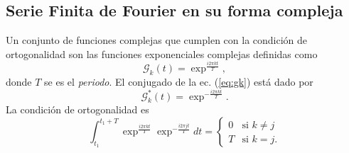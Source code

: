 \documentclass{article}
\begin{document}
\subsection*{Serie Finita de Fourier en su forma compleja}
Un conjunto de funciones complejas que cumplen con la condici\'on de ortogonalidad son las funciones exponenciales complejas definidas como
\begin{equation}
\mathscr{G}_k(t)=\exp^{\frac{i2\pi kt}{T}}, \label{eq:gk}
\end{equation}
donde $T$ se es el \textit{periodo}. El conjugado de la ec. (\ref{eq:gk}) est\'a dado por
\begin{equation}
\mathscr{G}_k^*(t)=\exp^{-\frac{i2\pi kt}{T}}.
\end{equation}
La condición de ortogonalidad es
\begin{equation}
\int_{t_1}^{t_1+T}\exp^{\frac{i2\pi kt}{T}}\exp^{-\frac{i2\pi jt}{T}}dt=\left\{\begin{array}{cc}
0 & \textrm{si }k\neq j \\
T & \textrm{si }k=j.
\end{array}\right.
\end{equation}
\end{document}
